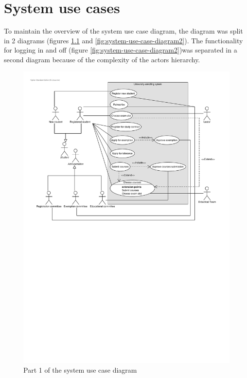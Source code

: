 \chapter{System use cases}
\label{system-uc}

\par To maintain the overview of the system use case diagram, the diagram was
split in 2 diagrams (figures \ref{fig:system-use-case-diagram1} and
\ref{fig:system-use-case-diagram2}). The functionality for logging in and off
(figure \ref{fig:system-use-case-diagram2})was separated in a second diagram
because of the complexity of the actors hierarchy.

\begin{figure}[H]
	\begin{centering}
		\includegraphics[width=\textwidth]{figs/system-use-case-diagram1.pdf}
		\caption{Part 1 of the system use case diagram}
		\label{fig:system-use-case-diagram1}
	\end{centering}
\end{figure}

